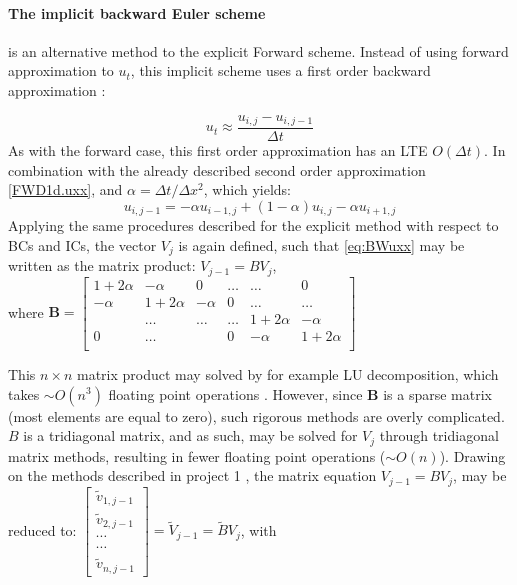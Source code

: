\documentclass[%
oneside,                 %
final,                   %
10pt]{article}
\begin{document}
\paragraph{The implicit backward Euler scheme}  is an alternative method to the explicit Forward scheme. Instead of using forward  approximation to $u_{t}$, this implicit scheme uses a first order backward approximation \citep[308]{HJ15}:

\begin{equation}
u_{t} \approx \frac{u_{i,j}- u_{i,j-1}}{\Delta t} \label{BW.ut}
\end{equation}
As with the forward case, this first order approximation has an LTE $O(\Delta t)$. In combination with the already described second order approximation \eqref{FWD1d.uxx}, and $\alpha=\Delta t/\Delta  x^2$, which yields:
\begin{equation}
u_{i,j-1}=-\alpha u_{i-1,j}+(1-\alpha)u_{i,j}-\alpha u_{i+1,j} \label{eq:BWuxx}
\end{equation}
Applying the same procedures described for the explicit method with respect to BCs and ICs, the vector $V_{j}$ is again defined, such that \eqref{eq:BWuxx} may be written as the matrix product:
$V_{j-1}=BV_j$,\\
where
$\textbf{B}=  \begin{bmatrix}
                           1+2\alpha & -\alpha & 0 &\dots   & \dots &0 \\
                           -\alpha & 1+2\alpha  &  -\alpha &0 &\dots &\dots \\
                           & \dots   & \dots &\dots   &1+2\alpha & -\alpha \\
                      
                           0&\dots    &  & 0  &-\alpha & 1+2\alpha \\
              			\end{bmatrix}$ 


This $n \times n$ matrix product may solved by for example LU decomposition, which takes $\sim O(n^3)$ floating point operations \citep[173]{HJ15}. However, since \textbf{B} is a sparse matrix (most elements are equal to zero), such rigorous methods are overly complicated. $B$ is a tridiagonal matrix, and as such, may be solved for $V_j$ through tridiagonal matrix methods, resulting in fewer floating point operations ($\sim O(n)$). Drawing on the methods described in project 1 \cite{P1}, the matrix equation $V_{j-1}=BV_j$, may be reduced to: \newline
$\begin{bmatrix} \tilde{v}_{1,j-1} \\ \tilde{v}_{2,j-1}\\ \cdots \\ \cdots \\ \tilde{v}_{n,j-1}\end{bmatrix}=\tilde{V}_{j-1}=\tilde{B}V_j$, with
\end{document}
